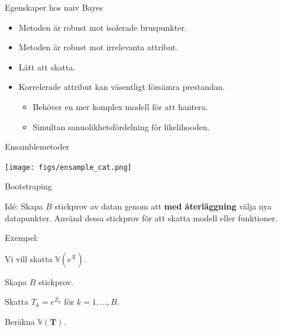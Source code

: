\documentclass[10pt,english]{beamer}
\begin{document}
\begin{frame}{Egenskaper hos naiv Bayes}
    \begin{itemize}
        \item Metoden är robust mot isolerade bruspunkter.
        \item Metoden är robust mot irrelevanta attribut.
        \item Lätt att skatta.
        \item Korrelerade attribut kan väsentligt försämra prestandan.
        \begin{itemize}
            \item Behöver en mer komplex modell för att hantera.
            \item Simultan sannolikhetsfördelning för likelihooden.
        \end{itemize}
    \end{itemize}
\end{frame}

\begin{frame}{Ensamblemetoder}
    
    \texttt{[image: figs/ensample\_cat.png]}

\end{frame}

\begin{frame}{Bootstraping}
    
    \begin{greenbox}
        Idé: Skapa $B$ stickprov av datan genom att \textbf{med återläggning} välja nya datapunkter. Använd dessa stickprov för att skatta modell eller funktioner.
    \end{greenbox}

    Exempel:

    Vi vill skatta $\mathbb{V}(e^{\bar{X}})$.

    Skapa $B$ stickprov.

    Skatta $T_k = e^{\bar{Z}_k}$ för $k = 1, \ldots, B$.

    Beräkna $\mathbb{V}(\mathbf{T})$.


\end{frame}
\end{document}
